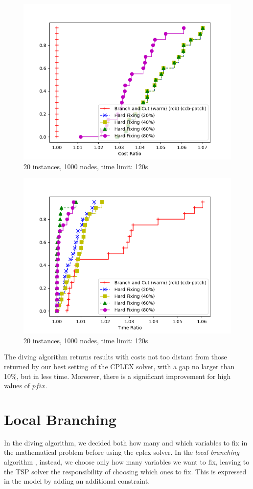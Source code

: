 \begin{figure}[h]
    \centering
    \includegraphics*[width=.6\textwidth]{../plots/perfprof_hard_costs.png}
    \caption*{20 instances, 1000 nodes, time limit: 120s}
\end{figure}
\FloatBarrier
\begin{figure}[h]
    \centering
    \includegraphics*[width=.6\textwidth]{../plots/perfprof_hard_times.png}
    \caption*{20 instances, 1000 nodes, time limit: 120s}
\end{figure}
\FloatBarrier

The diving algorithm returns results with costs not too distant from those returned by our best setting of the CPLEX solver, with a gap no larger than 10\%, but in less time. Moreover, there is a significant improvement for high values of $pfix$.

\section{Local Branching}

In the diving algorithm, we decided both how many and which variables to fix in the mathematical problem before using the cplex solver. In the \textit{local branching} algorithm \cite{Fischetti2003}, instead, we choose only how many variables we want to fix, leaving to the TSP solver the responsibility of choosing which ones to fix. This is expressed in the model by adding an additional constraint.

